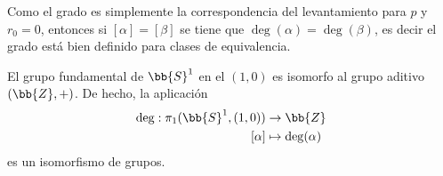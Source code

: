 \begin{observacion}
    Como el grado es simplemente la correspondencia del levantamiento para $p$ y $r_0=0$, entonces si $[\alpha]=[\beta]$ se tiene que $\deg(\alpha)=\deg(\beta)$, es decir el grado está bien definido para clases de equivalencia.
\end{observacion}

\begin{teo}
    El grupo fundamental de $\bb{S}^1$ en el $(1,0)$ es isomorfo al grupo aditivo $(\bb{Z}, +)$. De hecho, la aplicación
    \begin{align*}
        \deg: \pi_1(\bb{S}^1, (1,0)) &\to \bb{Z}\\
        [\alpha] & \mapsto \deg(\alpha)
    \end{align*}
    es un isomorfismo de grupos.


\end{teo}
